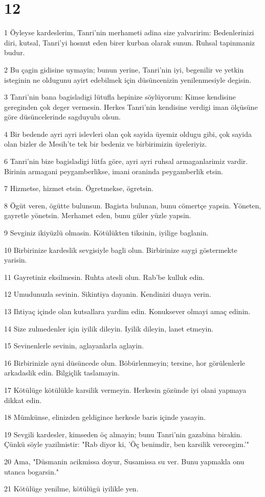 \chapter{12}

\par 1 Öyleyse kardeslerim, Tanri'nin merhameti adina size yalvaririm: Bedenlerinizi diri, kutsal, Tanri'yi hosnut eden birer kurban olarak sunun. Ruhsal tapinmaniz budur.
\par 2 Bu çagin gidisine uymayin; bunun yerine, Tanri'nin iyi, begenilir ve yetkin isteginin ne oldugunu ayirt edebilmek için düsüncenizin yenilenmesiyle degisin.
\par 3 Tanri'nin bana bagisladigi lütufla hepinize söylüyorum: Kimse kendisine gereginden çok deger vermesin. Herkes Tanri'nin kendisine verdigi iman ölçüsüne göre düsüncelerinde sagduyulu olsun.
\par 4 Bir bedende ayri ayri islevleri olan çok sayida üyemiz oldugu gibi, çok sayida olan bizler de Mesih'te tek bir bedeniz ve birbirimizin üyeleriyiz.
\par 6 Tanri'nin bize bagisladigi lütfa göre, ayri ayri ruhsal armaganlarimiz vardir. Birinin armagani peygamberlikse, imani oraninda peygamberlik etsin.
\par 7 Hizmetse, hizmet etsin. Ögretmekse, ögretsin.
\par 8 Ögüt veren, ögütte bulunsun. Bagista bulunan, bunu cömertçe yapsin. Yöneten, gayretle yönetsin. Merhamet eden, bunu güler yüzle yapsin.
\par 9 Sevginiz ikiyüzlü olmasin. Kötülükten tiksinin, iyilige baglanin.
\par 10 Birbirinize kardeslik sevgisiyle bagli olun. Birbirinize saygi göstermekte yarisin.
\par 11 Gayretiniz eksilmesin. Ruhta atesli olun. Rab'be kulluk edin.
\par 12 Umudunuzla sevinin. Sikintiya dayanin. Kendinizi duaya verin.
\par 13 Ihtiyaç içinde olan kutsallara yardim edin. Konuksever olmayi amaç edinin.
\par 14 Size zulmedenler için iyilik dileyin. Iyilik dileyin, lanet etmeyin.
\par 15 Sevinenlerle sevinin, aglayanlarla aglayin.
\par 16 Birbirinizle ayni düsüncede olun. Böbürlenmeyin; tersine, hor görülenlerle arkadaslik edin. Bilgiçlik taslamayin.
\par 17 Kötülüge kötülükle karsilik vermeyin. Herkesin gözünde iyi olani yapmaya dikkat edin.
\par 18 Mümkünse, elinizden geldigince herkesle baris içinde yasayin.
\par 19 Sevgili kardesler, kimseden öç almayin; bunu Tanri'nin gazabina birakin. Çünkü söyle yazilmistir: "Rab diyor ki, 'Öç benimdir, ben karsilik verecegim.'"
\par 20 Ama, "Düsmanin acikmissa doyur, Susamissa su ver. Bunu yapmakla onu utanca bogarsin."
\par 21 Kötülüge yenilme, kötülügü iyilikle yen.

